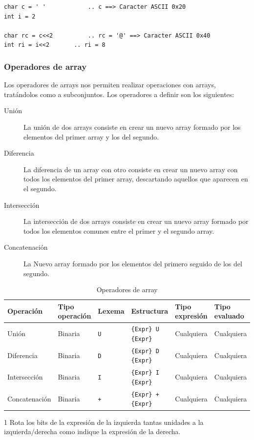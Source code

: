 \documentclass[11pt, english]{article}
\begin{document}
\begin{lstlisting}[caption=Ejemplo de uso los operadores bit a bit]
char c = ' '			.. c ==> Caracter ASCII 0x20
int i = 2

char rc = c<<2			.. rc = '@' ==> Caracter ASCII 0x40
int ri = i<<2  		.. ri = 8

\end{lstlisting}

\subsubsection{Operadores de array}
Los operadores de arrays nos permiten realizar operaciones con arrays, tratándolos como a subconjuntos. Los operadores a definir son los siguientes:
\begin{description}
	\item [Unión] La unión de dos arrays consiste en crear un nuevo array formado por los elementos del primer array y los del segundo.
	\item [Diferencia] La  diferencia de un array con otro consiste en crear un nuevo array con todos los elementos del primer array, descartando aquellos que aparecen en el segundo.
	\item [Intersección] La intersección de dos arrays consiste en crear un nuevo array formado por todos los elementos comunes entre el primer y el segundo array.
	\item [Concatenación] La Nuevo array formado por los elementos del primero seguido de los del segundo.
\end{description}

\begin{table}[H]
	\begin{center}
		\caption{Operadores de array}\label{tab:array-op}
		\begin{threeparttable}
			\begin{tabular}{l|l|l|l|l|l}
				\toprule
				\textbf{Operación} & \textbf{Tipo operación} & \textbf{Lexema} & \textbf{Estructura} & \textbf{Tipo expresión} & \textbf{Tipo evaluado}\\
				\midrule
				Unión & Binaria & \texttt{U} & \texttt{\{Expr\} U \{Expr\}} & Cualquiera & Cualquiera\\
				Diferencia & Binaria & \texttt{D} & \texttt{\{Expr\} D \{Expr\}} & Cualquiera & Cualquiera\\
				Intersección & Binaria & \texttt{I} & \texttt{\{Expr\} I \{Expr\}} & Cualquiera & Cualquiera\\
				Concatenación & Binaria & \texttt{+} & \texttt{\{Expr\} + \{Expr\}} & Cualquiera & Cualquiera\\
				\bottomrule
			\end{tabular}
			\begin{tablenotes}
				\small
				\item[1] Rota los bits de la expresión de la izquierda tantas unidades a la izquierda/derecha como indique la expresión de la derecha.
			\end{tablenotes}
		\end{threeparttable}
	\end{center}
\end{table}
\end{document}
